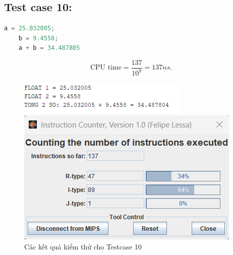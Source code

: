 \subsection{Test case 10:}
\begin{lstlisting}[language=Python]
    a = 25.032005;
    b = 9.4558;
    a + b = 34.487805
\end{lstlisting}
\[
\text{CPU time} = \frac{\text{137}}{10^9} = 137ns.
\]
\begin{figure}[!h]
    \centering
    \begin{minipage}[b]{0.48\textwidth}
        \centering
        \includegraphics[width=\textwidth]{image/TESTCASE/Testcase 10.png}
    \end{minipage}
    \hfill
    \begin{minipage}[b]{0.48\textwidth}
        \centering
        \includegraphics[width=\textwidth]{image/TESTCASE/Instruction Counter 10.png}
    \end{minipage}
    \vspace{0.5cm}
    \caption{Các kết quả kiểm thử cho Testcase 10}
\end{figure}


\vspace{0.5 cm}



